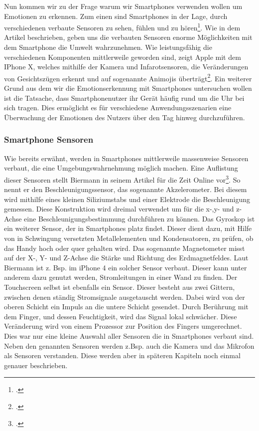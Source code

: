Nun kommen wir zu der Frage warum wir Smartphones verwenden wollen um Emotionen zu erkennen. Zum einen sind Smartphones in der Lage, durch verschiedenen verbaute Sensoren zu sehen, fühlen und zu hören\footcite[Vgl.][S. 1 Abs. 2]{Bie14}. Wie in dem Artikel beschrieben, geben uns die verbauten Sensoren enorme Möglichkeiten mit dem Smartphone die Umwelt wahrzunehmen. Wie leistungsfähig die verschiedenen Komponenten mittlerweile geworden sind, zeigt Apple mit dem IPhone X, welches mithilfe der Kamera und Infarotsensoren, die Veränderungen von Gesichtszügen erkennt und auf sogenannte Animojis überträgt\footcite[Vgl. ][Animoji: So funktioniert es]{Com17}. Ein weiterer Grund aus dem wir die Emotionserkennung mit Smartphones untersuchen wollen ist die Tatsache, dass Smartphonenutzer ihr Gerät häufig rund um die Uhr bei sich tragen. Dies ermöglicht es für verschiedene Anwendungsszenarien eine Überwachung der Emotionen des Nutzers über den Tag hinweg durchzuführen.
\subsubsection{Smartphone Sensoren}
Wie bereits erwähnt, werden in Smartphones mittlerweile massenweise Sensoren verbaut, die eine Umgebungswahrnehmung möglich machen. Eine Auflistung dieser Sensoren stellt Biermann in seinem Artikel für die Zeit Online vor\footcite[siehe ][]{Bie14}.\newline
So nennt er den Beschleunigungssensor, das sogenannte Akzelerometer. Bei diesem wird mithilfe eines kleinen Siliziumstabs und einer Elektrode die Beschleunigung gemessen. Diese Konstruktion wird dreimal verwendet um für die x-,y- und z-Achse eine Beschleunigungsbestimmung durchführen zu können.\newline
Das Gyroskop ist ein weiterer Sensor, der in Smartphones platz findet. Dieser dient dazu, mit Hilfe von in Schwingung versetzten Metallelementen und Kondensatoren, zu prüfen, ob das Handy hoch oder quer gehalten wird.\newline
Das sogenannte Magnetometer misst auf der X-, Y- und Z-Achse die Stärke und Richtung des Erdmagnetfeldes. Laut Biermann ist z. Bsp. im iPhone 4 ein solcher Sensor verbaut. Dieser kann unter anderem dazu genutzt werden, Stromleitungen in einer Wand zu finden.\newline
Der Touchscreen selbst ist ebenfalls ein Sensor. Dieser besteht aus zwei Gittern, zwischen denen ständig Stromsignale ausgetauscht werden. Dabei wird von der oberen Schicht ein Impuls an die untere Schicht gesendet. Durch Berührung mit dem Finger, und dessen Feuchtigkeit, wird das Signal lokal schwächer. Diese Veränderung wird von einem Prozessor zur Position des Fingers umgerechnet.\newline
Dies war nur eine kleine Auswahl aller Sensoren die in Smartphones verbaut sind. Neben den genannten Sensoren werden z.Bsp. auch die Kamera und das Mikrofon als Sensoren verstanden. Diese werden aber in späteren Kapiteln noch einmal genauer beschrieben.
